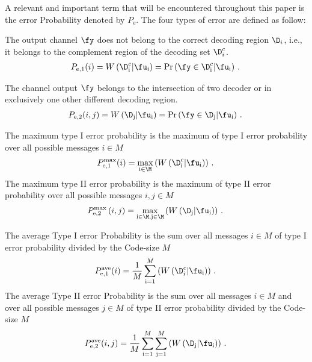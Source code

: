
A relevant and important term that will be encountered throughout this paper is the error Probability denoted by $P_\text{e}$. The four  types of error are defined as follow:
\begin{definition}
\label{TypeIerror}
The output channel $\fy$ does not belong to the correct decoding region $\D_i$, i.e., it belongs to the complement region of the decoding set $\D_i^c$.
\begin{align}
   P_{{\text{e}},1}(i) = W\left(\D_{\text{i}}^c|\fu_{\text{i}}\right) = \Pr\left(\fy\in\D_\text{i}^c|\fu_\text{i}\right)\,.\,
\end{align}
\end{definition}
\begin{definition}
\label{TypeIIerror}
The channel output $\fy$ belongs to the intersection of two decoder or in exclusively one other different decoding region.
\begin{align}
   P_{{\text{e}},2}(i,j) = W\left(\D_\text{j}|\fu_\text{i}\right)=\Pr\left(\fy\in\D_\text{j}|\fu_\text{i}\right)\,.\,
\end{align}
\end{definition}
\begin{definition}
\label{maxerror1}
The maximum type I error probability is the maximum of type I error probability over all possible messages $i \in M$
\begin{align}
   P_{{\text{e}},1}^{\text{max}}(i) =\max_{\text{i}\in\M}\left(W\left(\D_\text{i}^c|\fu_\text{i}\right)\right)\,.\,
\end{align}
The maximum type II error probability is the maximum of type II error probability  over all possible messages $i,j \in M$
\begin{align}
   P_{{\text{e}},2}^{\text{max}}\left(i,j\right) =\max_{{{\text{i}}\in\M}, {{\text{j}}\in\M}}\left(W\left(\D_{\text{j}}|\fu_{\text{i}}\right)\right)\,.\,
\end{align}
\end{definition}
\begin{definition}
\label{Average.error}
The average Type I error Probability is the sum over all messages $i \in M $ of type I error probability divided by the Code-size $M$
\begin{align}
   P_{{\text{e}},1}^{\text{ave}}(i) =\frac{1}{M}\sum_{{\text{i}}=1}^M \left(W\left(\D_{\text{i}}^c|\fu_{\text{i}}\right)\right)\,.\,
\end{align}
The average Type II error Probability is the sum over all messages $i \in M $ and over all possible messages $j \in M $ of type II error probability divided by the Code-size $M$
\begin{align}
   P_{{\text{e}},2}^{\text{ave}}(i,j) =\frac{1}{M}\sum_{{\text{i}}=1}^M \sum_{{\text{j}}=1}^M \left(W\left(\D_{\text{j}}|\fu_{\text{i}}\right)\right)\,.\,
\end{align}
\end{definition}

